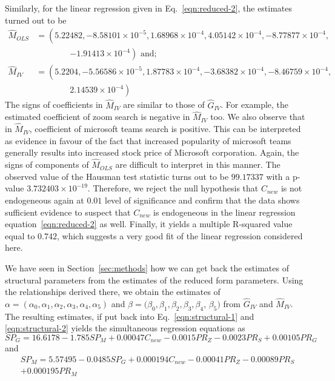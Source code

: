 \documentclass[11pt, a4paper]{article}
\begin{document}
Similarly, for the linear regression given in Eq.~\eqref{eqn:reduced-2}, the estimates turned out to be 
\begin{align*}
    \widehat{M}_{OLS} & = \left(5.22482, -8.58101\times 10^{-5}, 1.68968\times 10^{-4}, 4.05142\times 10^{-4}, -8.77877\times 10^{-4}, \right.\\
    & \qquad \qquad \left. -1.91413\times 10^{-4} \right) \text{ and; }\\
    \widehat{M}_{IV} & = \left(5.2204,  -5.56586\times 10^{-5}, 1.87783\times 10^{-4}, -3.68382\times 10^{-4}, -8.46759\times 10^{-4},\right.\\
    & \qquad \qquad \left. 2.14539\times 10^{-4} \right)
\end{align*}
The signs of coefficients in $\widehat{M}_{IV}$ are similar to those of $\widehat{G}_{IV}$. For example, the estimated coefficient of zoom search is negative in $\widehat{M}_{IV}$ too. We also observe that in $\widehat{M}_{IV}$, coefficient of microsoft teams search is positive. This can be interpreted as evidence in favour of the fact that increased popularity of microsoft teams generally results into increased stock price of Microsoft corporation. Again, the signs of components of $\widehat{M}_{OLS}$ are difficult to interpret in this manner. The observed value of the Hausman test statistic turns out to be $99.17337$ with a p-value $3.732403\times 10^{-19}$. Therefore, we reject the null hypothesis that $C_{new}$ is not endogeneous again at $0.01$ level of significance and confirm that the data shows sufficient evidence to suspect that $C_{new}$ is endogeneous in the linear regression equation~\eqref{eqn:reduced-2} as well. Finally, it yields a multiple R-squared value equal to $0.742$, which suggests a very good fit of the linear regression considered here. 

We have seen in Section~\ref{sec:methods} how we can get back the estimates of structural parameters from the estimates of the reduced form parameters. Using the relationships derived there, we obtain the estimates of $\alpha=(\alpha_{0}, \alpha_{1}, \alpha_{2}, \alpha_{3}, \alpha_{4}, \alpha_{5})$ and $\beta=(\beta_{0}, \beta_{1}, \beta_{2}, \beta_{3}, \beta_{4}$, $\beta_{5})$ from $\widehat{G}_{IV}$ and $\widehat{M}_{IV}$. The resulting estimates, if put back into Eq.~\eqref{eqn:structural-1} and \eqref{eqn:structural-2} yields the simultaneous regression equations as 
\begin{equation}
    SP_{G} = 16.6178-1.785SP_{M}+0.00047C_{new}-0.0015PR_{Z}-0.0023PR_{S}+0.00105PR_{G} \label{eqn:structural-1-solved}
\end{equation}
\noindent and
\begin{multline}
SP_{M} = 5.57495-0.0485SP_{G}+0.000194C_{new}-0.00041PR_{Z}-0.00089PR_{S}\\+0.000195PR_{M} \label{eqn:structural-2-solved}    
\end{multline}
\end{document}
